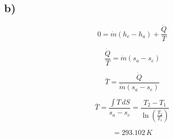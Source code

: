 

\subsection*{b)}

\[
0 = \dot{m} (h_e - h_a) + \frac{\dot{Q}}{T}
\]

\[
\frac{\dot{Q}}{T} = \dot{m} (s_a - s_e)
\]

\[
\bar{T} = \frac{\dot{Q}}{\dot{m} (s_a - s_e)}
\]

\[
\bar{T} = \frac{\int T \, dS}{s_a - s_e} = \frac{T_2 - T_1}{\ln \left( \frac{T_2}{T_1} \right)}
\]

\[
= 293.102 \, K
\]